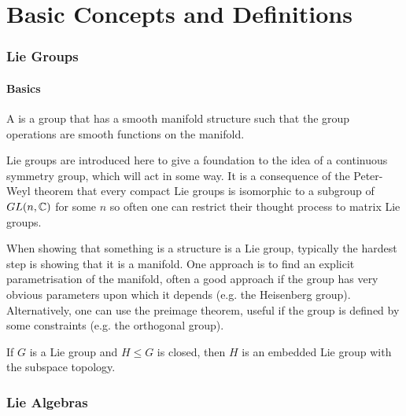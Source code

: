 \documentclass{article}
\begin{document}
\part{Basic Concepts and Definitions}

\section{Lie Groups}
\subsection{Basics}
\begin{definition}
	A  is a group that has a smooth manifold structure such that the group operations are smooth functions on the manifold. 
\end{definition}

\begin{idea}
	Lie groups are introduced here to give a foundation to the idea of a continuous symmetry group, which will act in some way. It is a consequence of the Peter-Weyl theorem that every compact Lie groups is isomorphic to a subgroup of $GL(n,\mathbb{C})$ for some $n$ so often one can restrict their thought process to matrix Lie groups.
\end{idea}

\begin{idea}
	When showing that something is a structure is a Lie group, typically the hardest step is showing that it is a manifold. One approach is to find an explicit parametrisation of the manifold, often a good approach if the group has very obvious parameters upon which it depends (e.g. the Heisenberg group). Alternatively, one can use the preimage theorem, useful if the group is defined by some constraints (e.g. the orthogonal group).
\end{idea}

\begin{theorem}
	If $G$ is a Lie group and $H\leq G$ is closed, then $H$ is an embedded Lie group with the subspace topology. 
\end{theorem}



\section{Lie Algebras}
\end{document}
